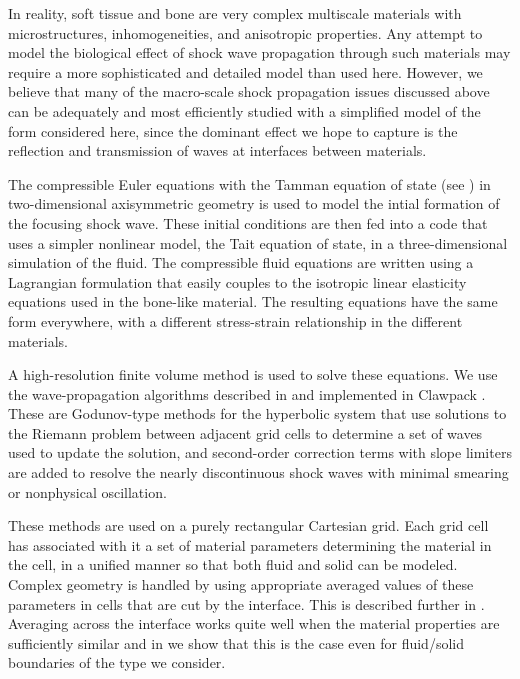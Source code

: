 In reality, soft tissue and bone are very complex multiscale materials
with microstructures, inhomogeneities, and anisotropic properties.
Any attempt to model the biological effect of shock wave propagation
through such materials may require a more sophisticated and detailed
model than used here.  However, we believe that many of the macro-scale
shock propagation issues discussed above can be adequately and most
efficiently studied with a simplified model of the form considered here,
since the dominant effect we hope to capture is the reflection and
transmission of waves at interfaces between materials.  

The compressible Euler equations with the Tamman equation of state (see
) in two-dimensional axisymmetric geometry is used to model the
intial formation of the focusing shock wave.  These initial conditions are
then fed into a code that uses a simpler nonlinear
model, the Tait equation of state,
in a three-dimensional simulation of the fluid.  The compressible fluid
equations are written using a Lagrangian formulation that easily couples to
the isotropic linear elasticity equations used in the bone-like material.
The resulting equations have the same form everywhere, with a different
stress-strain relationship in the different materials.

A high-resolution finite volume method is used to solve these equations.
We use the wave-propagation algorithms described in \cite{??}
and implemented in Clawpack \cite{claw.org.url}.  These are Godunov-type
methods for the hyperbolic system that use solutions to the Riemann problem
between adjacent grid cells to determine a set of waves used to update the
solution, and second-order correction terms with slope limiters are added to
resolve the nearly discontinuous shock waves with minimal smearing or
nonphysical oscillation.

These methods are used on a purely rectangular Cartesian grid.  Each
grid cell has associated with it a set of material parameters
determining the material in the cell, in a unified manner so that
both fluid and solid can be modeled.   Complex geometry is handled
by using appropriate averaged values of these parameters in cells
that are cut by the interface.  This is described further in .
Averaging across the interface works quite well when the material properties
are sufficiently similar and in  we show that this is the case even
for fluid/solid boundaries of the type we consider.  


